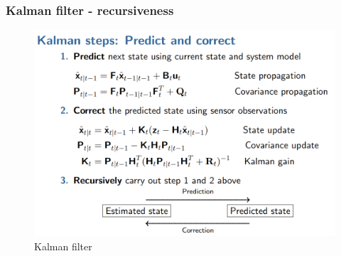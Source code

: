 \documentclass[10pt]{beamer}
\begin{document}
\begin{frame}
  \frametitle{Kalman filter - recursiveness}

  \begin{figure}
    \includegraphics[width=\textwidth]{figs/kalman_recursiveness.png}
    \caption{Kalman filter \cite{pedersenPositioningLocationAwareness2022}}
  \end{figure}

\end{frame}
\end{document}
